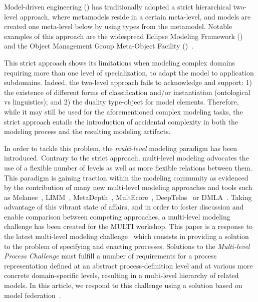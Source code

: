 Model-driven engineering (\MDE) has traditionally adopted a strict hierarchical two-level approach, where metamodels reside in a certain meta-level, and models are created one meta-level below by using types from the metamodel. Notable examples of this approach are the widespread Eclipse Modeling Framework (\EMF)~\parencite{emf} and the Object Management Group Meta-Object Facility (\MOF)~\parencite{omg2013mof}.

This strict approach shows its limitations when modeling complex domains requiring more than one level of specialization, \eg to adapt the model to application subdomains. Indeed, the two-level approach fails to acknowledge and support: 1) the existence of different forms of classification and/or instantiation (\eg ontological vs linguistics); and 2) the duality type-object for model elements. Therefore, while it may still be used for the aforementioned complex modeling tasks, the strict approach entails the introduction of accidental complexity in both the modeling process and the resulting modeling artifacts.

In order to tackle this problem, the \emph{multi-level} modeling paradigm has
been introduced. Contrary to the strict approach, multi-level modeling
advocates the use of a flexible number of levels as well as more flexible
relations between them. %
This paradigm is gaining traction within the modeling community as evidenced by
the contribution of many new multi-level modeling approaches and tools such as
Melanee~\parencite{melanee}, LIMM~\parencite{icse2011-limm},
MetaDepth~\parencite{metadepth}, MultEcore~\parencite{multecore2016},
DeepTelos~\parencite{deeptelos2016} or DMLA~\parencite{dmla2017}. Taking
advantage of this vibrant state of affairs, and in order to foster discussion
and enable comparison between competing approaches, a multi-level modeling
challenge has been created for the MULTI workshop. This paper is a response to
the latest multi-level modeling challenge~\parencite{multiProcessChallenge-emisaj}
which consists in providing a solution to the problem of specifying and
enacting processes. Solutions to the \emph{Multi-level Process Challenge} must
fulfill a number of requirements for a process representation defined at an
abstract process-definition level and at various more concrete domain-specific
levels, resulting in a multi-level hierarchy of related models. In this
article, we respond to this challenge using a solution based on model
federation~\parencite{Golra2016-federation}.

